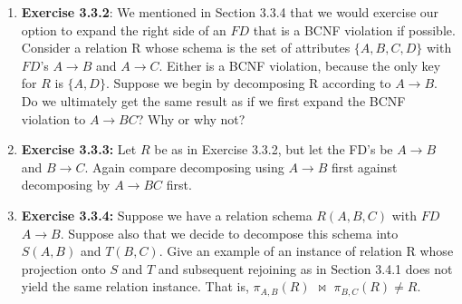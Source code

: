 \documentclass[12pt]{article}
\begin{document}
\begin{enumerate}[1.]
    \item \textbf{Exercise 3.3.2}: We mentioned in Section 3.3.4 that we would exercise our
    option to expand the right side of an $FD$ that is a BCNF violation if possible.
    Consider a relation R whose schema is the set of attributes $\{A, B, C, D\}$ with
    $FD$'s $A \to B$ and $A \to C$. Either is a BCNF violation, because the only key
    for $R$ is $\{A, D\}$. Suppose we begin by decomposing R according to $A \to B$. Do
    we ultimately get the same result as if we first expand the BCNF violation to
    $A \to BC$? Why or why not?

    \item \textbf{Exercise 3.3.3:} Let $R$ be as in Exercise 3.3.2, but let the FD's be $A \to B$ and
    $B \to C$. Again compare decomposing using $A \to B$ first against decomposing
    by $A \to BC$ first.

    \item \textbf{Exercise 3.3.4:} Suppose we have a relation schema $R(A, B, C)$ with $FD$ $A \to
    B$. Suppose also that we decide to decompose this schema into $S(A, B)$ and
    $T(B, C)$. Give an example of an instance of relation R whose projection onto
    $S$ and $T$ and subsequent rejoining as in Section 3.4.1 does not yield the same
    relation instance. That is, $\pi_{A,B}(R)$ $\bowtie$ $\pi_{B,C}(R) \neq R$.

\end{enumerate}
\end{document}
